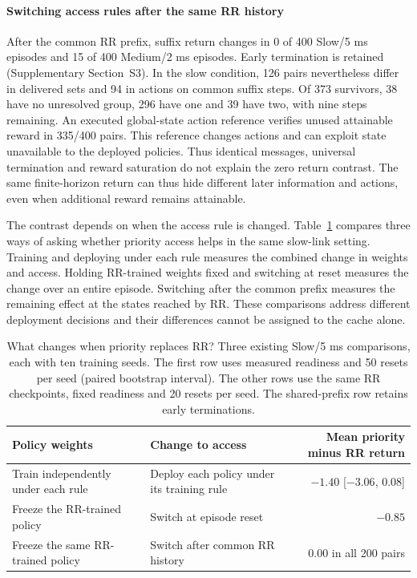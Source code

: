 \documentclass[a4paper,fleqn]{cas-dc}
\begin{document}
\paragraph{Switching access rules after the same RR history}
After the common RR prefix, suffix return changes in 0 of 400 Slow/5 ms episodes and 15 of 400 Medium/2 ms episodes. Early termination is retained (Supplementary Section~S3). In the slow condition, 126 pairs nevertheless differ in delivered sets and 94 in actions on common suffix steps. Of 373 survivors, 38 have no unresolved group, 296 have one and 39 have two, with nine steps remaining. An executed global-state action reference verifies unused attainable reward in 335/400 pairs. This reference changes actions and can exploit state unavailable to the deployed policies. Thus identical messages, universal termination and reward saturation do not explain the zero return contrast. The same finite-horizon return can thus hide different later information and actions, even when additional reward remains attainable.

The contrast depends on when the access rule is changed. Table~\ref{tab:which_switch} compares three ways of asking whether priority access helps in the same slow-link setting. Training and deploying under each rule measures the combined change in weights and access. Holding RR-trained weights fixed and switching at reset measures the change over an entire episode. Switching after the common prefix measures the remaining effect at the states reached by RR. These comparisons address different deployment decisions and their differences cannot be assigned to the cache alone.

\begin{table}[pos=t]\centering\small
\caption{What changes when priority replaces RR? Three existing Slow/5 ms comparisons, each with ten training seeds. The first row uses measured readiness and 50 resets per seed (paired bootstrap interval). The other rows use the same RR checkpoints, fixed readiness and 20 resets per seed. The shared-prefix row retains early terminations.}\label{tab:which_switch}
\begin{tabularx}{\textwidth}{@{}XXr@{}}
\toprule
Policy weights & Change to access & Mean priority minus RR return\\\midrule
Train independently under each rule & Deploy each policy under its training rule & $-1.40$ [$-3.06$, $0.08$]\\
Freeze the RR-trained policy & Switch at episode reset & $-0.85$\\
Freeze the same RR-trained policy & Switch after common RR history & $0.00$ in all 200 pairs\\
\bottomrule
\end{tabularx}
\end{table}
\end{document}
